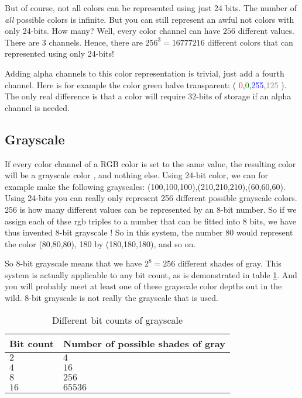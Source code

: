 \begin{refsection}
  But of course, not all colors can be represented using just
  24 bits. The number of \textit{all} possible colors is infinite. But you can still
  represent an awful not colors with only 24-bits. How many? Well, every
  color channel can have $256$ different values. There are $3$
  channels. Hence, there are $256^3 = 16777216$ different colors that
  can represented using only 24-bits!

  \newcommand{\rgbaquad}[4]{(
    \textcolor{red}{#1},\textcolor{green}{#2},\textcolor{blue}{#3},\textcolor{gray}{#4} )}

  Adding alpha channels to this color representation is trivial, just
  add a fourth channel. Here is for example the color green halve
  transparent: \rgbaquad{0}{0}{255}{125}. The only real difference is
  that a color will require 32-bits of storage if an alpha channel is needed.

  \subsection{Grayscale}
  \label{sec:other-colors-depths}

  \newcommand{\selfrgbtrip}[3]{\textcolor[RGB]{#1,#2,#3}{(#1,#2,#3)}}
  \newcommand{\selfrgbtripgray}[1]{\selfrgbtrip{#1}{#1}{#1}}

  If every color channel of a RGB color is set to the same value, the
  resulting color will be a grayscale color ,
  and nothing else. Using 24-bit color, we can for example make the
  following grayscales:
  \selfrgbtripgray{100},\selfrgbtripgray{210},\selfrgbtripgray{60}. Using
  24-bits you can really only represent 256 different possible
  grayscale colors. 256 is how many different values can be
  represented by an 8-bit number. So if we assign each of thse rgb
  triples to a number that can be fitted into 8 bits, we have thus
  invented 8-bit grayscale ! So in this system,
  the number 80 would represent the color \selfrgbtripgray{80}, 180 by
  \selfrgbtripgray{180}, and so on. \cite{puglia00:_handbook_dig_proj}

  So 8-bit grayscale means that we have $2^8=256$ different shades of
  gray. This system is actually applicable to any bit count, as is
  demonstrated in table \ref{tab:grayscale}. And you will probably meet at least one of
  these grayscale color depths out in the wild. 8-bit grayscale is not
  really the grayscale that is used.

  \begin{table}[h!]
    \centering
    \begin{tabular}{|l|l|}
      \hline
      Bit count & Number of possible shades of gray \\ \hline
      $2$ & $4$ \\ \hline
      $4$ & $16$ \\ \hline
      $8$ & $256$ \\ \hline
      $16$ & $65536$ \\ \hline
    \end{tabular}
    \caption{Different bit counts of grayscale}
    \label{tab:grayscale}
  \end{table}


\end{refsection}
